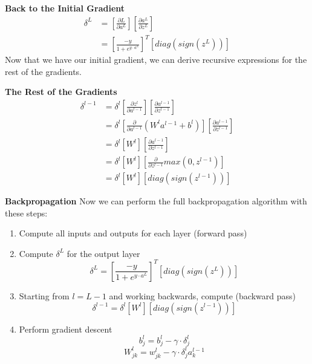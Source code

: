 \documentclass{article}
\begin{document}
\begin{enumerate}
            \textbf{Back to the Initial Gradient}
                \[
                    \begin{aligned}
                        \delta^{L} & = [\frac{\partial L}{\partial a^L}] [\frac{\partial a^L}{\partial z^L}] \\
                        & = [\frac{-y}{1 + e^{y \cdot a^L}}]^T [diag(sign(z^L))]
                    \end{aligned}
                \]
            Now that we have our initial gradient, we can derive recursive expressions for the rest of the gradients.

            \textbf{The Rest of the Gradients}
                \[
                    \begin{aligned}
                        \delta^{l-1} & = \delta^{l}[\frac{\partial z^l}{\partial a^{l-1}}] [\frac{\partial a^{l-1}}{\partial z^{l-1}}] \\
                        & = \delta^{l} [\frac{\partial}{\partial a^{l-1}} (W^l a^{l-1} + b^l)] [\frac{\partial a^{l-1}}{\partial z^{l-1}}] \\
                        & = \delta^{l} [W^l] [\frac{\partial a^{l-1}}{\partial z^{l-1}}] \\
                        & = \delta^{l} [W^l] [\frac{\partial}{\partial z^{l-1}} max(0, z^{l-1})] \\
                        & = \delta^{l} [W^l] [diag(sign(z^{l-1}))]
                    \end{aligned}
                \]

            \textbf{Backpropagation}
                Now we can perform the full backpropagation algorithm with these steps:

                \begin{enumerate}
                    \item Compute all inputs and outputs for each layer (forward pass)
                    \item Compute \( \delta^L \) for the output layer
                        \[ \delta^L = [\frac{-y}{1 + e^{y \cdot a^L}}]^T [diag(sign(z^L))] \]
                    \item Starting from \(l = L - 1\) and working backwards, compute (backward pass)
                        \[ \delta^{l-1} = \delta^{l} [W^l] [diag(sign(z^{l-1}))] \]
                    \item Perform gradient descent
                        \[ b^l_j = b^l_j - \gamma \cdot \delta^l_j \]
                        \[ W^l_{jk} = w^l_{jk} - \gamma \cdot \delta^l_j a^{l-1}_k \]
                \end{enumerate}
    \end{enumerate}
\end{document}
